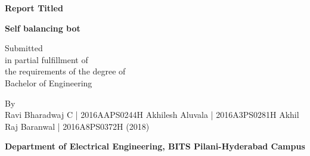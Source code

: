 \begin{titlepage}
	\thispagestyle{empty}
	\begin{center}
	\vspace*{1cm}

	\LARGE
	\textbf{Report Titled}

	\vspace{0.5cm}

	\Huge
	\textbf{Self balancing bot}

	\vspace{1.5cm}

	{\Large Submitted}\\
	{\Large in partial fulfillment of}\\
	{\Large the requirements of the degree of}\\
	{\Large Bachelor of Engineering}\\

	\vfill

\Large
	By\\
	Ravi Bharadwaj C   | 2016AAPS0244H \newline
	Akhilesh Aluvala   | 2016A3PS0281H \newline
  Akhil Raj Baranwal | 2016A8PS0372H \newline
	\vspace{1cm}
	(2018)




	\vfill

\Large
\textbf{Department of Electrical Engineering, BITS Pilani-Hyderabad Campus}

	\end{center}

\end{titlepage}

